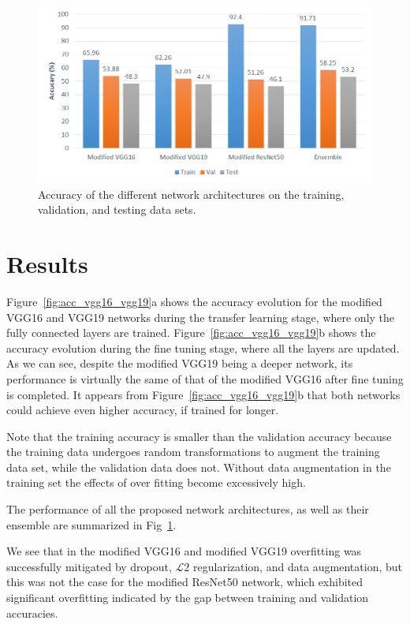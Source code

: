 \documentclass[10pt,twocolumn,letterpaper]{article}
\begin{document}
\begin{figure}[t!]
	\centering
	\includegraphics[width=0.99\linewidth]{figs/final_results.jpg}
	\caption{Accuracy of the different network architectures on the training, validation, and testing data sets.}
	\label{fig:final_results}
\end{figure}

\section{Results} \label{sec:results}

Figure~\ref{fig:acc_vgg16_vgg19}a shows the accuracy evolution for the modified VGG16 and VGG19 networks during the transfer learning stage, where only the fully connected layers are trained. Figure~\ref{fig:acc_vgg16_vgg19}b shows the accuracy evolution during the fine tuning stage, where all the layers are updated. As we can see, despite the modified VGG19 being a deeper network, its performance is virtually the same of that of the modified VGG16 after fine tuning is completed. It appears from Figure~\ref{fig:acc_vgg16_vgg19}b that both networks could achieve even higher accuracy, if trained for longer.

Note that the training accuracy is smaller than the validation accuracy because the training data undergoes random transformations to augment the training data set, while the validation data does not. Without data augmentation in the training set the effects of over fitting become excessively high. 

The performance of all the proposed network architectures, as well as their ensemble are summarized in Fig~\ref{fig:final_results}. 

We see that in the modified VGG16 and modified VGG19 overfitting was successfully mitigated by dropout, $\mathcal{L}2$ regularization, and data augmentation, but this was not the case for the modified ResNet50 network, which exhibited significant overfitting indicated by the gap between training and validation accuracies. 
\end{document}
